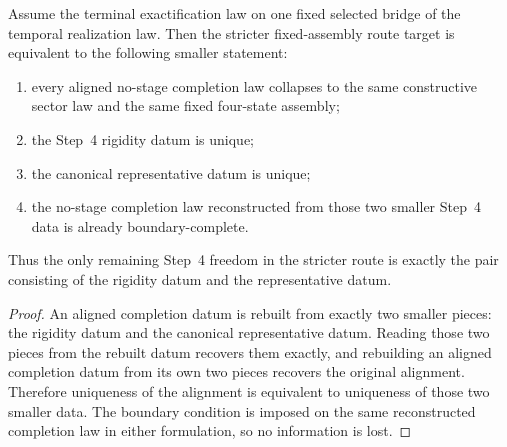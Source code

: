 \begin{theorem}
\label{thm:canonical-law-native-parts-boundary-route-target}
Assume the terminal exactification law on one fixed selected bridge of the
temporal realization law. Then the stricter fixed-assembly route target is
equivalent to the following smaller statement:
\begin{enumerate}
\item every aligned no-stage completion law collapses to the same constructive
sector law and the same fixed four-state assembly;
\item the Step~4 rigidity datum is unique;
\item the canonical representative datum is unique;
\item the no-stage completion law reconstructed from those two smaller Step~4
data is already boundary-complete.
\end{enumerate}
Thus the only remaining Step~4 freedom in the stricter route is exactly the
pair consisting of the rigidity datum and the representative datum.
\end{theorem}

\begin{proof}
An aligned completion datum is rebuilt from exactly two smaller pieces: the
rigidity datum and the canonical representative datum. Reading those two
pieces from the rebuilt datum recovers them exactly, and rebuilding an aligned
completion datum from its own two pieces recovers the original alignment.
Therefore uniqueness of the alignment is equivalent to uniqueness of those two
smaller data. The boundary condition is imposed on the same
reconstructed completion law in either formulation, so no information is lost.
\end{proof}

